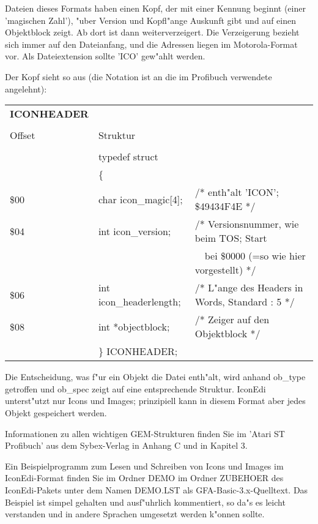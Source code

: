 \begin{appendix}
Dateien dieses Formats haben einen Kopf, der mit einer
Kennung beginnt (einer 'magischen Zahl'), "uber Version
und Kopfl"ange Auskunft gibt und auf einen Objektblock 
zeigt. Ab dort ist dann weiterverzeigert. Die 
Verzeigerung bezieht sich immer auf den Dateianfang, und
die Adressen liegen im Motorola-Format vor. Als Dateiextension
sollte 'ICO' gew"ahlt werden.

Der Kopf sieht so aus (die Notation ist an die im Profibuch 
verwendete angelehnt):

\begin{tabular}{lll}
{\bf ICONHEADER} &                & \\
        &                         & \\
Offset  & Struktur                & \\ \hline
        &                         & \\
        & typedef struct          & \\
        & \{                      & \\
{\$}00  & char icon\_magic[4];    & /* enth"alt 'ICON'; \$49434F4E */ \\
{\$}04  & int icon\_version;      & /* Versionsnummer, wie beim TOS; Start \\
        &                         & ~~bei \$0000 (=so wie hier vorgestellt) */ \\   
{\$}06  & int icon\_headerlength; & /* L"ange des Headers in Words, Standard : 5 */ \\
{\$}08  & int *objectblock;       & /* Zeiger auf den Objektblock */ \\
        & \} ICONHEADER;          & \\

\end{tabular}

Die Entscheidung, was f"ur ein Objekt die Datei enth"alt, wird anhand
ob\_type getroffen und ob\_spec zeigt auf eine entsprechende 
Struktur. IconEdi unterst"utzt nur Icons und Images; prinzipiell
kann in diesem Format aber jedes Objekt gespeichert werden.

Informationen zu allen wichtigen GEM-Strukturen finden Sie im
'Atari ST Profibuch' aus dem Sybex-Verlag in Anhang C und in 
Kapitel 3.

Ein Beispielprogramm zum Lesen und Schreiben von Icons und Images
im IconEdi-Format finden Sie im Ordner DEMO im Ordner ZUBEHOER
des IconEdi-Pakets unter dem Namen DEMO.LST als 
GFA-Basic-3.x-Quelltext. Das Beispiel ist simpel gehalten und
ausf"uhrlich kommentiert, so da"s es leicht verstanden und in
andere Sprachen umgesetzt werden k"onnen sollte. 


\end{appendix}
